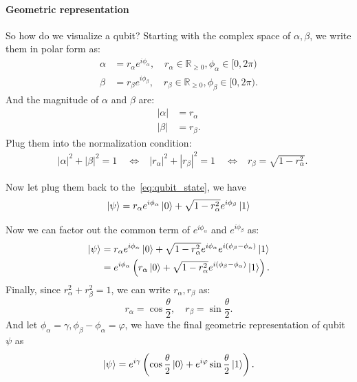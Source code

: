 \documentclass[10pt,article]{IEEEtran}
\begin{document}
\paragraph{Geometric representation}
So how do we visualize a qubit? 
Starting with the complex space of \(\alpha, \beta\), we write them in polar form as:
\begin{equation}
    \begin{aligned}
        \alpha & = r_\alpha e^{i\phi_\alpha},  \quad r_\alpha \in \mathbb{R}_{\geq 0}, \phi_\alpha \in [0, 2\pi)\\
        \beta & = r_\beta e^{i\phi_\beta},     \quad r_\beta \in \mathbb{R}_{\geq 0}, \phi_\beta \in [0, 2\pi).
    \end{aligned}
\end{equation}
And the magnitude of \(\alpha\) and \(\beta\) are:
\begin{equation}
    \begin{aligned}
        |\alpha| & = r_\alpha \\
        |\beta| & = r_\beta.
    \end{aligned}
\end{equation}
Plug them into the normalization condition:
\begin{equation}
    \begin{aligned}
                        & |\alpha|^2 + |\beta|^2 = 1 \quad
        \Leftrightarrow & \left| r_\alpha  \right|^2 + \left|r_\beta \right|^2 = 1 \quad
        \Leftrightarrow & r_\beta = \sqrt{1 - r_\alpha^2}.
    \end{aligned}
\end{equation}

Now let plug them back to the~\eqref{eq:qubit_state}, we have
\begin{equation}
    \ket{\psi} = r_\alpha e^{i\phi_\alpha}\ket{0} + \sqrt{1 - r_\alpha^2} e^{i\phi_\beta}\ket{1}
\end{equation}

Now we can factor out the common term of \(e^{i\phi_\alpha}\) and \(e^{i\phi_\beta}\) as:
\begin{equation}
    \begin{aligned}
        \ket{\psi} &= r_\alpha e^{i\phi_\alpha}\ket{0} + \sqrt{1 - r_\alpha^2} e^{i\phi_\alpha}e^{i(\phi_\beta-\phi_\alpha)}\ket{1} \\
                   &= e^{i\phi_\alpha}\left(r_\alpha \ket{0} +  \sqrt{1 - r_\alpha^2}  e^{i(\phi_\beta-\phi_\alpha)} \ket{1} \right).
    \end{aligned}
\end{equation}
Finally, since \(r_\alpha^2 + r_\beta^2 = 1\), we can write \(r_\alpha, r_\beta\) as:
\begin{equation}
    r_\alpha = \cos{\frac{\theta}{2}}, \quad r_\beta = \sin{\frac{\theta}{2}}.
\end{equation}
And let \(\phi_\alpha = \gamma, \phi_\beta-\phi_\alpha = \varphi\), we have the final geometric representation of qubit \(\psi\) as
\begin{equation}
    \ket{\psi} = e^{i\gamma}\left(\cos{\frac{\theta}{2}}\ket{0} + e^{i\varphi}\sin{\frac{\theta}{2}}\ket{1}\right).
\end{equation}
\end{document}
